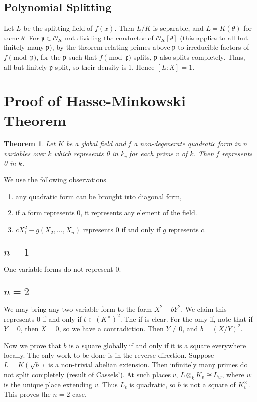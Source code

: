 \documentclass[12pt]{amsart}
\newtheorem*{theorem}{Theorem}
\theoremstyle{named}
\newcommand{\roi}[1]{\mathcal{O}_{#1}}
\newcommand{\prim}{\mathfrak{p}}
\begin{document}
\subsection{Polynomial Splitting} Let $L$
be the splitting field of $f(x)$. Then $L/K$ is separable, and $L = K(\theta)$
for some $\theta$. For $\prim \in \roi K$ not dividing the conductor of
$\roi K[\theta]$ (this applies to all but finitely many $\prim$), by the
theorem relating primes above $\prim$ to irreducible factors of $f \pmod \prim$,
for the $\prim$ such that $f \pmod \prim$ splits, $\prim$ also splits
completely. Thus, all but finitely $\prim$ split, so their density is 1. Hence
$[L : K] = 1$.



\section{Proof of Hasse-Minkowski Theorem}
\begin{theorem}
Let $K$ be a global field and $f$ a non-degenerate quadratic
form in $n$ variables over $k$ which represents 0 in $k_v$ for each prime $v$ of
$k$. Then $f$ represents 0 in $k$.
\end{theorem}
We use the following observations
\begin{enumerate}
\item any quadratic form can be brought into diagonal form,
\item if a form represents 0, it represents any element of the field.
\item $cX_1^2 - g(X_2, ..., X_n)$ represents 0 if and only if $g$ represents
$c$.
\end{enumerate}

\subsection{$n = 1$} One-variable forms do not represent 0.
\subsection{$n = 2$} We may bring any two variable form to the form
$X^2 - bY^2$. We claim this represents 0 if and only if $b \in (K^\times)^2$.
The if is clear. For the only if, note that if $Y = 0$, then $X = 0$, so we have
a contradiction. Then $Y \neq 0$, and $b = (X/Y)^2$.

Now we prove that $b$ is a square globally if and only if it is a square
everywhere locally. The only work to be done is in the reverse direction.
Suppose $L = K(\sqrt{b})$ is a non-trivial abelian extension. Then infinitely
many primes do not split completely (result of Cassels'). At such places $v$,
$L \otimes_k K_v \cong L_w$, where $w$ is the unique place extending $v$. Thus
$L_v$ is quadratic, so $b$ is not a square of $K_v^\times$. This proves the
$n = 2$ case.
\end{document}
